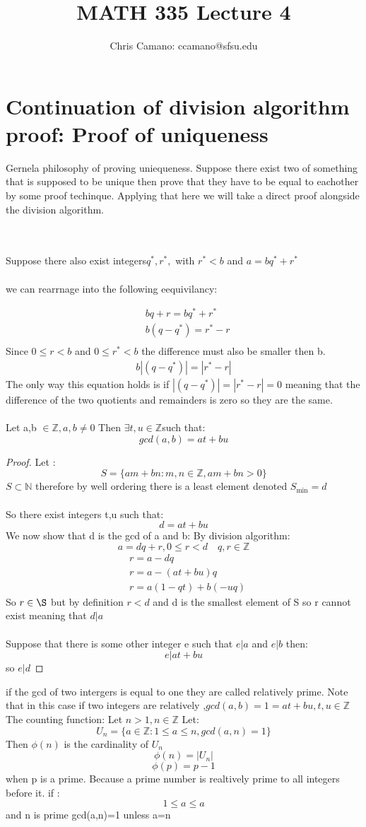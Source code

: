 \documentclass[12pt]{article}
\author{Chris Camano: ccamano@sfsu.edu}
\title{MATH 335  Lecture 4 }
\date
\newcommand{\sect}[1]{\section*{#1}}
\newcommand{\Z}{\mathbb{Z}}
\newcommand{\N}{\mathbb{N}}
\theoremstyle{definition}
\theoremstyle{remark}
\numberwithin{equation}{section}
\begin{document}
\maketitle
\sect{Continuation of division algorithm proof: Proof of uniqueness}
Gernela philosophy of proving uniequeness. Suppose there exist two of something that is supposed to be unique then prove that they have to be equal to eachother by some proof techinque. Applying that here we will take a direct proof alongside the division algorithm.

\\\\
Suppose there also exist integers$q^*,r^*,$ with $r^*<b$ and $a=bq^*+r^*$\\\\
we can rearrnage into the following eequivilancy:

\begin{align*}
  &bq+r=bq^*+r^*\\
  &b(q-q^*)=r^*-r\\
\end{align*}
Since $0\leq r<b$ and $0\leq r^*<b$ the difference must also be smaller then b.
\begin{align*}
  b|(q-q^*)|=|r^*-r|
\end{align*}
The only way this equation holds is if $|(q-q^*)|=|r^*-r|=0$ meaning that the difference of the two quotients and remainders is zero so they are the same. \\\\
\thm Let a,b $\in \Z, a,b\neq 0$ Then $\exists t,u\in \Z$such that:
\[
  gcd(a,b)=at+bu
\]
\begin{proof}
  Let :
  \[
    S=\{am+bn: m,n\in \Z , am+bn>0\}
  \]
  $S\subset \N$ therefore by well ordering there is a least element denoted $S_{\min}=d$\\\\
  So there exist integers t,u such that:
  \[
    d=at+bu
  \]
  We now show that d is the gcd of a and b:
  By division algorithm:
  \[
    a=dq+r,0\leq r <d\quad q,r \in \Z
  \]
  \begin{align*}
    &r=a-dq\\
    &r=a-(at+bu)q\\
    &r=a(1-qt)+b(-uq)
  \end{align*}
  So $r\in \S$ but by definition $ r<d$ and d is the smallest element of S so r cannot exist meaning that $d|a$\\\\
  Suppose that there is some other integer e such that $e|a$ and $e|b$ then:
  \[
    e|at+bu
  \]
  so $e|d$
\end{proof}
 if the gcd of two intergers is equal to one they are called relatively prime. Note that in this case if two integers are relatively
,$gcd(a,b)=1=at+bu,t,u\in \Z$\\
 The counting function: Let $n>1, n\in \Z$ Let: \[
  U_n=\{a\in \Z: 1\leq a\leq n, gcd(a,n)=1\}
\]
Then $\phi(n)$ is the cardinality of $U_n$
\[
  \phi(n)=|U_n|
\]
\[
  \phi(p)=p-1
\]
when p is a prime. Because a prime number is realtively prime to all integers before it. if :
\[
  1\leq a \leq a
\]
and n is prime gcd(a,n)=1 unless a=n
\end{document}
